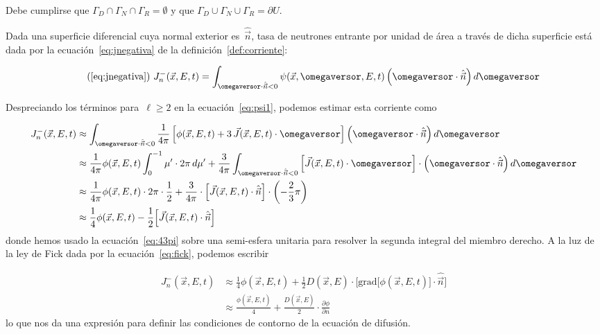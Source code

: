 Debe cumplirse que $\Gamma_D \cap \Gamma_N \cap \Gamma_R = \emptyset$ y que $\Gamma_D \cup \Gamma_N \cup \Gamma_R = \partial U$.

\medskip

Dada una superficie diferencial cuya normal exterior es~$\hat{\vec{n}}$, tasa de neutrones entrante por unidad de área a través de dicha superficie está dada por la ecuación~\eqref{eq:jnegativa} de la definición~\ref{def:corriente}:

\begin{equation}\tag{\ref{eq:jnegativa}}
\ J_n^-(\vec{x},E,t) = \int_{\omegaversor \cdot \hat{\vec{n}} < 0} \psi(\vec{x}, \omegaversor, E, t) \left(\omegaversor \cdot \hat{\vec{n}}\right) d\omegaversor 
\end{equation}

Despreciando los términos para~$\ell \geq 2$ en la ecuación~\eqref{eq:psi1}, podemos estimar esta corriente como

\begin{align*}
J_n^-(\vec{x},E,t) & \approx \int_{\omegaversor \cdot \hat{\vec{n}} < 0} \frac{1}{4\pi} \left [ \phi(\vec{x}, E, t) + 3 \, \vec{J}(\vec{x}, E, t) \cdot \omegaversor \right]  \left(\omegaversor \cdot \hat{\vec{n}}\right) d\omegaversor
\\
& \approx \frac{1}{4\pi} \phi(\vec{x}, E, t) \int_{0}^{-1} \mu^\prime \cdot 2\pi\, d\mu^\prime + 
\frac{3}{4\pi}  \int_{\omegaversor \cdot \hat{\vec{n}} < 0} \Big[ \vec{J}(\vec{x}, E, t) \cdot \omegaversor \Big] \cdot \left(\omegaversor \cdot \hat{\vec{n}}\right) d\omegaversor \\
& \approx \frac{1}{4\pi} \phi(\vec{x}, E, t) \cdot 2\pi \cdot \frac{1}{2} + \frac{3}{4\pi} \cdot \Big[ \vec{J}(\vec{x}, E, t) \cdot \hat{\vec{n}} \Big] \cdot \left(- \frac{2}{3} \pi \right)  \\
& \approx \frac{1}{4} \phi(\vec{x}, E, t) - \frac{1}{2} \Big[ \vec{J}(\vec{x}, E, t) \cdot \hat{\vec{n}} \Big]
\end{align*}
%
donde hemos usado la ecuación~\eqref{eq:43pi} sobre una semi-esfera unitaria para resolver la segunda integral del miembro derecho. A la luz de la ley de Fick dada por la ecuación~\eqref{eq:fick}, podemos escribir

\begin{align*}
J_n^-(\vec{x},E,t) & \approx \frac{1}{4} \phi(\vec{x}, E, t) + \frac{1}{2} D(\vec{x}, E) \cdot \Big[ \text{grad} \big[ \phi(\vec{x}, E, t)\big]  \cdot \hat{\vec{n}} \Big] \\
& \approx \frac{\phi(\vec{x}, E, t)}{4}  + \frac{D(\vec{x}, E)}{2}  \cdot \frac{\partial \phi}{\partial n}
\end{align*}
%
lo que nos da una expresión para definir las condiciones de contorno de la ecuación de difusión.

